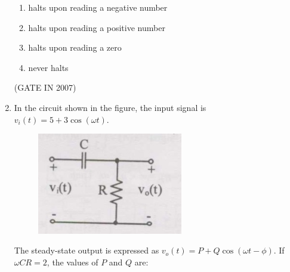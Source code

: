 \documentclass[journal]{IEEEtran}
\begin{document}
\begin{enumerate}
\begin{enumerate}
    \item halts upon reading a negative number
    \item halts upon reading a positive number
    \item halts upon reading a zero
    \item never halts
\end{enumerate}

\hfill(GATE IN 2007)
\item In the circuit shown in the figure, the input signal is $v_i(t) = 5 + 3 \cos(\omega t)$. 
\begin{figure}[H]
    \centering
      \includegraphics[width=0.6\textwidth]{41.jpg} 
      \caption{}
    \label{fig:fig41} 
\end{figure}
The steady-state output is expressed as $v_o(t) = P + Q \cos(\omega t - \phi)$. If $\omega CR = 2$, the values of $P$ and $Q$ are:


\end{enumerate}
\end{document}
